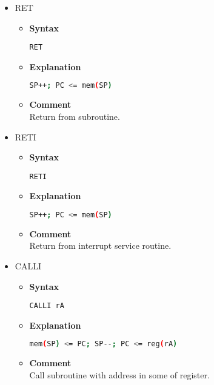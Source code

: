 \begin{itemize}

    \item RET
    \begin{itemize}
        \item \textbf{Syntax}
        \begin{lstlisting}[language={[x86masm]Assembler}, frame=single]
    RET
        \end{lstlisting}
        \item \textbf{Explanation}
        \begin{lstlisting}[language=bash, frame=single]
    SP++; PC <= mem(SP)
        \end{lstlisting}
        \item \textbf{Comment} \\
    Return from subroutine.
    \end{itemize}

    \item RETI
    \begin{itemize}
        \item \textbf{Syntax}
        \begin{lstlisting}[language={[x86masm]Assembler}, frame=single]
    RETI
        \end{lstlisting}
        \item \textbf{Explanation}
        \begin{lstlisting}[language=bash, frame=single]
    SP++; PC <= mem(SP)
        \end{lstlisting}
        \item \textbf{Comment} \\
    Return from interrupt service routine.
    \end{itemize}

    \item CALLI
    \begin{itemize}
        \item \textbf{Syntax}
        \begin{lstlisting}[language={[x86masm]Assembler}, frame=single]
    CALLI rA
        \end{lstlisting}
        \item \textbf{Explanation}
        \begin{lstlisting}[language=bash, frame=single]
    mem(SP) <= PC; SP--; PC <= reg(rA)
        \end{lstlisting}
        \item \textbf{Comment} \\
    Call subroutine with address in some of register.
    \end{itemize}


\end{itemize}
